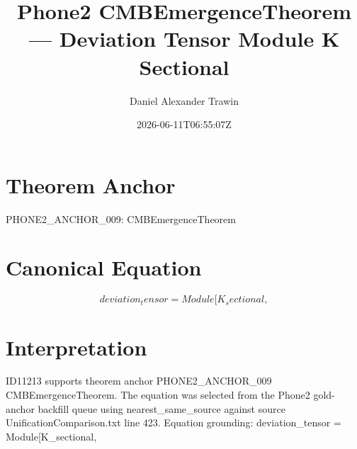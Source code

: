 \documentclass[11pt]{article}
\title{Phone2 CMBEmergenceTheorem — Deviation Tensor Module K Sectional}
\author{Daniel Alexander Trawin}
\date{2026-06-11T06:55:07Z}
\begin{document}
\maketitle
\section*{Theorem Anchor}
PHONE2_ANCHOR_009: CMBEmergenceTheorem
\section*{Canonical Equation}
\[
deviation_tensor = Module[{K_sectional},
\]
\section*{Interpretation}
ID11213 supports theorem anchor PHONE2_ANCHOR_009 CMBEmergenceTheorem. The equation was selected from the Phone2 gold-anchor backfill queue using nearest_same_source against source UnificationComparison.txt line 423. Equation grounding: deviation_tensor = Module[{K_sectional},
\end{document}
